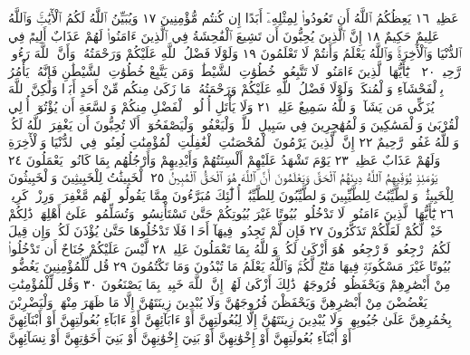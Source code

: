 عَظِيمࣱ ١٦ يَعِظُكُمُ ٱللَّهُ أَن تَعُودُوا۟ لِمِثْلِهِۦٓ أَبَدًا إِن كُنتُم
مُّؤْمِنِينَ ١٧ وَيُبَيِّنُ ٱللَّهُ لَكُمُ ٱلْأٓيَٰتِۚ وَٱللَّهُ عَلِيمٌ حَكِيمٌ ١٨ إِنَّ
ٱلَّذِينَ يُحِبُّونَ أَن تَشِيعَ ٱلْفَٰحِشَةُ فِي ٱلَّذِينَ ءَامَنُوا۟ لَهُمْ عَذَابٌ
أَلِيمࣱ فِي ٱلدُّنْيَا وَٱلْأٓخِرَةِۚ وَٱللَّهُ يَعْلَمُ وَأَنتُمْ لَا تَعْلَمُونَ ١٩ وَلَوْلَا
فَضْلُ ٱللَّهِ عَلَيْكُمْ وَرَحْمَتُهُۥ وَأَنَّ ٱللَّهَ رَءُوفࣱ رَّحِيمࣱ ٢٠
۞ يَٰٓأَيُّهَا ٱلَّذِينَ ءَامَنُوا۟ لَا تَتَّبِعُوا۟ خُطُوَٰتِ ٱلشَّيْطَٰنِۚ وَمَن يَتَّبِعْ
خُطُوَٰتِ ٱلشَّيْطَٰنِ فَإِنَّهُۥ يَأْمُرُ بِٱلْفَحْشَآءِ وَٱلْمُنكَرِۚ وَلَوْلَا
فَضْلُ ٱللَّهِ عَلَيْكُمْ وَرَحْمَتُهُۥ مَا زَكَىٰ مِنكُم مِّنْ أَحَدٍ أَبَدࣰا وَلَٰكِنَّ
ٱللَّهَ يُزَكِّي مَن يَشَآءُۗ وَٱللَّهُ سَمِيعٌ عَلِيمࣱ ٢١ وَلَا يَأْتَلِ أُو۟لُوا۟ ٱلْفَضْلِ
مِنكُمْ وَٱلسَّعَةِ أَن يُؤْتُوٓا۟ أُو۟لِي ٱلْقُرْبَىٰ وَٱلْمَسَٰكِينَ وَٱلْمُهَٰجِرِينَ
فِي سَبِيلِ ٱللَّهِۖ وَلْيَعْفُوا۟ وَلْيَصْفَحُوٓا۟ۗ أَلَا تُحِبُّونَ أَن يَغْفِرَ ٱللَّهُ
لَكُمْۚ وَٱللَّهُ غَفُورࣱ رَّحِيمٌ ٢٢ إِنَّ ٱلَّذِينَ يَرْمُونَ ٱلْمُحْصَنَٰتِ
ٱلْغَٰفِلَٰتِ ٱلْمُؤْمِنَٰتِ لُعِنُوا۟ فِي ٱلدُّنْيَا وَٱلْأٓخِرَةِ وَلَهُمْ عَذَابٌ
عَظِيمࣱ ٢٣ يَوْمَ تَشْهَدُ عَلَيْهِمْ أَلْسِنَتُهُمْ وَأَيْدِيهِمْ وَأَرْجُلُهُم بِمَا
كَانُوا۟ يَعْمَلُونَ ٢٤ يَوْمَئِذࣲ يُوَفِّيهِمُ ٱللَّهُ دِينَهُمُ ٱلْحَقَّ وَيَعْلَمُونَ أَنَّ
ٱللَّهَ هُوَ ٱلْحَقُّ ٱلْمُبِينُ ٢٥ ٱلْخَبِيثَٰتُ لِلْخَبِيثِينَ وَٱلْخَبِيثُونَ
لِلْخَبِيثَٰتِۖ وَٱلطَّيِّبَٰتُ لِلطَّيِّبِينَ وَٱلطَّيِّبُونَ لِلطَّيِّبَٰتِۚ
أُو۟لَٰٓئِكَ مُبَرَّءُونَ مِمَّا يَقُولُونَۖ لَهُم مَّغْفِرَةࣱ وَرِزْقࣱ كَرِيمࣱ ٢٦ يَٰٓأَيُّهَا
ٱلَّذِينَ ءَامَنُوا۟ لَا تَدْخُلُوا۟ بُيُوتًا غَيْرَ بُيُوتِكُمْ حَتَّىٰ تَسْتَأْنِسُوا۟
وَتُسَلِّمُوا۟ عَلَىٰٓ أَهْلِهَاۚ ذَٰلِكُمْ خَيْرࣱ لَّكُمْ لَعَلَّكُمْ تَذَكَّرُونَ ٢٧
فَإِن لَّمْ تَجِدُوا۟ فِيهَآ أَحَدࣰا فَلَا تَدْخُلُوهَا حَتَّىٰ يُؤْذَنَ لَكُمْۖ
وَإِن قِيلَ لَكُمُ ٱرْجِعُوا۟ فَٱرْجِعُوا۟ۖ هُوَ أَزْكَىٰ لَكُمْۚ وَٱللَّهُ بِمَا
تَعْمَلُونَ عَلِيمࣱ ٢٨ لَّيْسَ عَلَيْكُمْ جُنَاحٌ أَن تَدْخُلُوا۟ بُيُوتًا
غَيْرَ مَسْكُونَةࣲ فِيهَا مَتَٰعࣱ لَّكُمْۚ وَٱللَّهُ يَعْلَمُ مَا تُبْدُونَ وَمَا
تَكْتُمُونَ ٢٩ قُل لِّلْمُؤْمِنِينَ يَغُضُّوا۟ مِنْ أَبْصَٰرِهِمْ وَيَحْفَظُوا۟
فُرُوجَهُمْۚ ذَٰلِكَ أَزْكَىٰ لَهُمْۚ إِنَّ ٱللَّهَ خَبِيرُۢ بِمَا يَصْنَعُونَ ٣٠
وَقُل لِّلْمُؤْمِنَٰتِ يَغْضُضْنَ مِنْ أَبْصَٰرِهِنَّ وَيَحْفَظْنَ
فُرُوجَهُنَّ وَلَا يُبْدِينَ زِينَتَهُنَّ إِلَّا مَا ظَهَرَ مِنْهَاۖ وَلْيَضْرِبْنَ
بِخُمُرِهِنَّ عَلَىٰ جُيُوبِهِنَّۖ وَلَا يُبْدِينَ زِينَتَهُنَّ إِلَّا لِبُعُولَتِهِنَّ
أَوْ ءَابَآئِهِنَّ أَوْ ءَابَآءِ بُعُولَتِهِنَّ أَوْ أَبْنَآئِهِنَّ أَوْ أَبْنَآءِ بُعُولَتِهِنَّ
أَوْ إِخْوَٰنِهِنَّ أَوْ بَنِيٓ إِخْوَٰنِهِنَّ أَوْ بَنِيٓ أَخَوَٰتِهِنَّ أَوْ نِسَآئِهِنَّ
